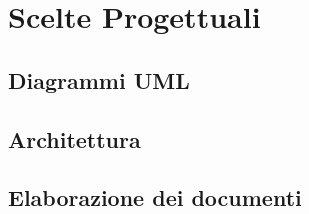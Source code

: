 \def \ti{\textit}
\def \bf{\textbf}

\chapter{Scelte Progettuali}
	\label{cap:progettazione}
	
\section{Diagrammi UML}
	\label{sec:uml}

\section{Architettura}
	\label{sec:architettura}

\section{Elaborazione dei documenti}
	\label{sec:documenti}